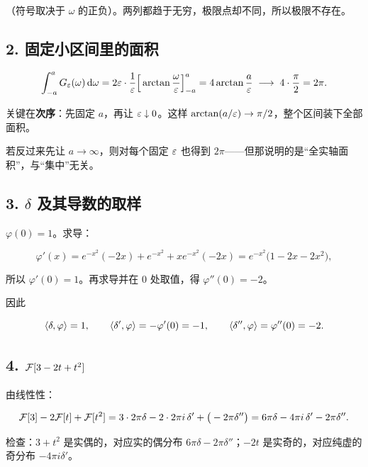 （符号取决于 $\omega$ 的正负）。两列都趋于无穷，极限点却不同，所以极限不存在。

\subsection*{2. 固定小区间里的面积}

\begin{equation}
\int_{-a}^{a}G_\varepsilon(\omega)\mathop{}\!\mathrm{d}\omega
=2\varepsilon\cdot\frac{1}{\varepsilon}\Big[\arctan\frac{\omega}{\varepsilon}\Big]_{-a}^{a}
=4\arctan\frac{a}{\varepsilon}\;\longrightarrow\;4\cdot\frac{\pi}{2}=2\pi .
\end{equation}

关键在\textbf{次序}：先固定 $a$，再让 $\varepsilon\downarrow0$。这样 $\arctan(a/\varepsilon)\to\pi/2$，整个区间装下全部面积。

若反过来先让 $a\to\infty$，则对每个固定 $\varepsilon$ 也得到 $2\pi$——但那说明的是“全实轴面积”，与“集中”无关。

\subsection*{3. $\delta$ 及其导数的取样}

$\varphi(0)=1$。求导：

\begin{equation}
\varphi'(x)=e^{-x^{2}}(-2x)+e^{-x^{2}}+x e^{-x^{2}}(-2x)=e^{-x^{2}}\big(1-2x-2x^{2}\big),
\end{equation}

所以 $\varphi'(0)=1$。再求导并在 $0$ 处取值，得 $\varphi''(0)=-2$。

因此

\begin{equation}
\langle \delta,\varphi\rangle=1,
\qquad
\langle \delta',\varphi\rangle=-\varphi'(0)=-1,
\qquad
\langle \delta'',\varphi\rangle=\varphi''(0)=-2 .
\end{equation}

\subsection*{4. $\mathcal{F}[3-2t+t^{2}]$}

由线性性：

\begin{equation}
\mathcal{F}[3]-2\mathcal{F}[t]+\mathcal{F}[t^{2}]
=3\cdot2\pi\delta-2\cdot2\pi i\,\delta'+\big(-2\pi\delta''\big)
=6\pi\delta-4\pi i\,\delta'-2\pi\delta'' .
\end{equation}

检查：$3+t^{2}$ 是实偶的，对应实的偶分布 $6\pi\delta-2\pi\delta''$；$-2t$ 是实奇的，对应纯虚的奇分布 $-4\pi i\delta'$。

